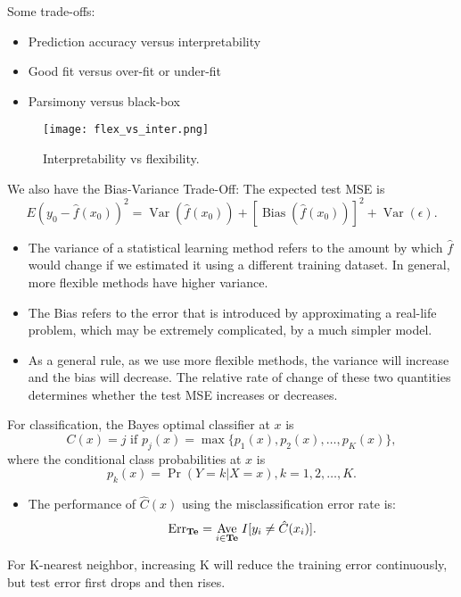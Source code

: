 \documentclass[11pt, a4paper]{article}
\begin{document}
Some trade-offs:
\begin{itemize}
\item Prediction accuracy versus interpretability
\item Good fit versus over-fit or under-fit
\item Parsimony versus black-box
\end{itemize}
\begin{figure}
[h!]
\centering
\texttt{[image: flex\_vs\_inter.png]}
\caption{Interpretability vs flexibility.}
\end{figure}
We also have the Bias-Variance Trade-Off: The expected test MSE is
\[
  E(y_0-\hat{f}(x_0))^2=\operatorname{Var}(\hat{f}(x_0))+[\operatorname{Bias}(\hat{f}(x_0))]^2+\operatorname{Var}(\epsilon).
\]
\begin{itemize}
  \item The variance of a statistical learning method refers to the amount by which $\hat{f}$ would change if we estimated it using a different training dataset. In general, more flexible methods have higher variance.
  \item The Bias refers to the error that is introduced by approximating a real-life problem, which may be extremely complicated, by a much simpler model.
  \item As a general rule, as we use more flexible methods, the variance will increase and the bias will decrease. The relative rate of change of these two quantities determines whether the test MSE increases or decreases. 
\end{itemize}
For classification, the Bayes optimal classifier at $x$ is 
\[
  C(x)=j \text{ if } p_j(x)=\max\{p_1(x),p_2(x),\dots,p_K(x)\},
\]
where the conditional class probabilities at $x$ is
\[
  p_k(x)=\operatorname{Pr}(Y=k|X=x), k=1,2,\dots,K.
\]
\begin{itemize}
  \item The performance of $\hat{C}(x)$ using the misclassification error rate is:
    \[
      {\operatorname{Err}}_{\text{\textbf{Te}}}=\underset{i\in \text{\textbf{Te}}}{\operatorname{Ave}}\;I[y_i\neq \hat{C}(x_i)].
    \]
\end{itemize}
For K-nearest neighbor, increasing K will reduce the training error continuously, but test error first drops and then rises.
\end{document}
